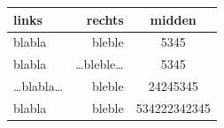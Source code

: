 \documentclass{article}
\begin{document}
\begin{tabular}{|l|r||c|}
  \hline
  links &rechts &midden\\
  \hline\hline
  blabla&bleble&5345\\
  \hline
  blabla&\ldots bleble\ldots &5345\\
  \hline
  \ldots blabla\ldots &bleble&24245345\\
  \hline
  blabla&bleble&534222342345\\
  \hline
\end{tabular}
\end{document}
